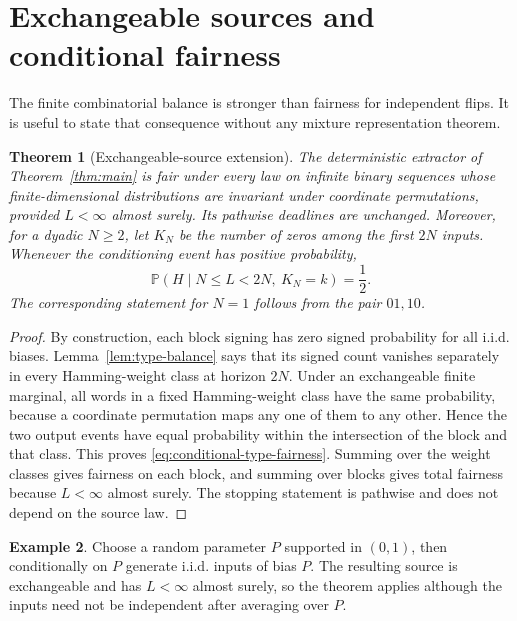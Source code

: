 \documentclass[11pt]{article}
\newtheorem{theorem}{Theorem}[section]
\theoremstyle{definition}
\newtheorem{example}[theorem]{Example}
\theoremstyle{remark}
\newcommand{\Prb}{\mathbb P}
\begin{document}
\section{Exchangeable sources and conditional fairness}\label{sec:exchangeability}

The finite combinatorial balance is stronger than fairness for independent
flips. It is useful to state that consequence without any mixture
representation theorem.

\begin{theorem}[Exchangeable-source extension]\label{thm:exchangeable}
The deterministic extractor of Theorem~\ref{thm:main} is fair under every
law on infinite binary sequences whose finite-dimensional distributions
are invariant under coordinate permutations, provided $L<\infty$ almost
surely. Its pathwise deadlines are unchanged.
Moreover, for a dyadic $N\ge2$, let $K_N$ be the number of zeros among
the first $2N$ inputs. Whenever the conditioning event has positive
probability,
\begin{equation}\label{eq:conditional-type-fairness}
 \Prb(H\mid N\le L<2N,\ K_N=k)=\frac12.
\end{equation}
The corresponding statement for $N=1$ follows from the pair $01,10$.
\end{theorem}
\begin{proof}
By construction, each block signing has zero signed probability for all
i.i.d. biases. Lemma~\ref{lem:type-balance} says that its signed count
vanishes separately in every Hamming-weight class at horizon $2N$.
Under an exchangeable finite marginal, all words in a fixed Hamming-weight
class have the same probability, because a coordinate permutation maps
any one of them to any other. Hence the two output events have equal
probability within the intersection of the block and that class. This
proves \eqref{eq:conditional-type-fairness}.
Summing over the weight classes gives fairness on each block, and summing
over blocks gives total fairness because $L<\infty$ almost surely.
The stopping statement is pathwise and does not depend on the source law.
\end{proof}

\begin{example}
Choose a random parameter $P$ supported in $(0,1)$, then conditionally
on $P$ generate i.i.d. inputs of bias $P$. The resulting source is
exchangeable and has $L<\infty$ almost surely, so the theorem applies
although the inputs need not be independent after averaging over $P$.
\end{example}
\end{document}
